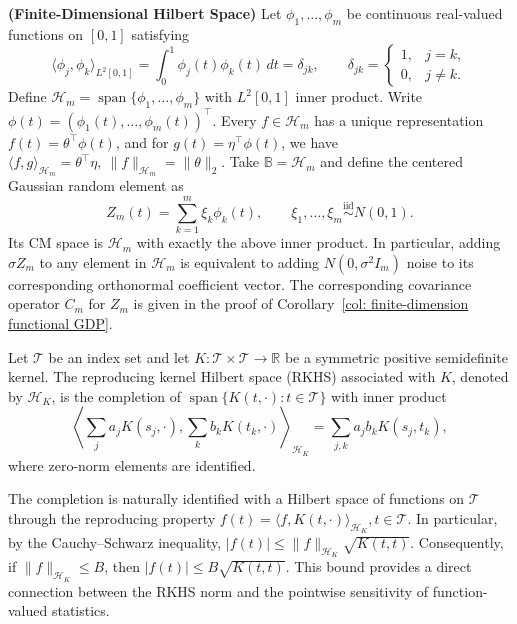 \documentclass[twoside,11pt]{article}
\begin{document}
\begin{example}\textup{\textbf{(Finite-Dimensional Hilbert Space)}}
\label{ex: finite CM}
Let $\phi_1,\ldots,\phi_m$ be continuous real-valued functions on $[0,1]$ satisfying
\[
\langle\phi_j,\phi_k\rangle_{L^2[0,1]}
=\int_0^1\phi_j(t)\phi_k(t)\,dt=\delta_{jk},
\qquad
\delta_{jk}=\begin{cases}1,&j=k,\\0,&j\ne k.\end{cases}
\]
Define $\mathcal H_m=\operatorname{span}\{\phi_1,\ldots,\phi_m\}$ with $L^2[0,1]$ inner product. Write $\phi(t)=(\phi_1(t),\ldots,\phi_m(t))^\top$. Every $f\in\mathcal H_m$ has a unique representation $f(t)=\theta^\top\phi(t)$, and for $g(t)=\eta^\top\phi(t)$, we have $\langle f,g\rangle_{\mathcal H_m}=\theta^\top\eta,\ \|f\|_{\mathcal H_m}=\|\theta\|_2$. Take $\mathbb B=\mathcal H_m$ and define the centered Gaussian random element as
\[
Z_m(t)=\sum_{k=1}^m\xi_k\phi_k(t),\qquad
\xi_1,\ldots,\xi_m\overset{\mathrm{iid}}\sim N(0,1).
\]
Its CM space is $\mathcal H_m$ with exactly the above inner product. In particular, adding $\sigma Z_m$ to any element in  $\mathcal H_m$ is equivalent to adding $N(0,\sigma^2I_m)$ noise to its corresponding orthonormal coefficient vector. The corresponding covariance operator $C_m$ for $Z_m$ is given in the proof of Corollary~\ref{col: finite-dimension functional GDP}.
\end{example}

\begin{definition}
\label{def: RKHS}
Let $\mathcal{T}$ be an index set and let $K:\mathcal{T}\times\mathcal{T}\rightarrow\mathbb{R}$ be a symmetric positive semidefinite kernel. The reproducing kernel Hilbert space (RKHS) associated with $K$, denoted by $\mathcal{H}_K$, is the completion of $\operatorname{span}\{K(t,\cdot):t\in\mathcal{T}\}$ with inner product
\[
\left\langle
\sum_j a_jK(s_j,\cdot),\sum_k b_kK(t_k,\cdot)
\right\rangle_{\mathcal H_K}
=\sum_{j,k}a_jb_kK(s_j,t_k),
\]
where zero-norm elements are identified. 
\end{definition}

The completion is naturally identified with a Hilbert space of functions on $\mathcal{T}$ through the reproducing property $f(t)=\langle f,K(t,\cdot)\rangle_{\mathcal H_K},t\in \mathcal{T}$. In particular, by the Cauchy--Schwarz inequality, $|f(t)| \leq \|f\|_{\mathcal{H}_K} \sqrt{K(t,t)}$. Consequently, if $\|f\|_{\mathcal{H}_K}\leq B$, then $|f(t)|\leq B\sqrt{K(t,t)}$. This bound provides a direct connection between the RKHS norm and the pointwise sensitivity of function-valued statistics.
\end{document}
